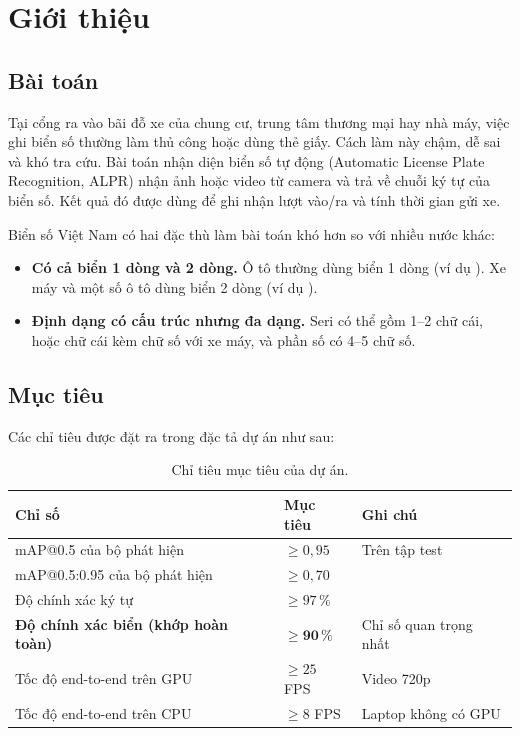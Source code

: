 \section{Giới thiệu}

\subsection{Bài toán}
Tại cổng ra vào bãi đỗ xe của chung cư, trung tâm thương mại hay nhà máy, việc ghi biển số thường làm thủ công hoặc dùng thẻ giấy. Cách làm này chậm, dễ sai và khó tra cứu. Bài toán nhận diện biển số tự động (Automatic License Plate Recognition, ALPR) nhận ảnh hoặc video từ camera và trả về chuỗi ký tự của biển số. Kết quả đó được dùng để ghi nhận lượt vào/ra và tính thời gian gửi xe.

Biển số Việt Nam có hai đặc thù làm bài toán khó hơn so với nhiều nước khác:
\begin{itemize}[nosep]
  \item \textbf{Có cả biển 1 dòng và 2 dòng.} Ô tô thường dùng biển 1 dòng (ví dụ ). Xe máy và một số ô tô dùng biển 2 dòng (ví dụ ).
  \item \textbf{Định dạng có cấu trúc nhưng đa dạng.} Seri có thể gồm 1--2 chữ cái, hoặc chữ cái kèm chữ số với xe máy, và phần số có 4--5 chữ số.
\end{itemize}

\subsection{Mục tiêu}
Các chỉ tiêu được đặt ra trong đặc tả dự án như sau:

\begin{table}[H]
\centering
\caption{Chỉ tiêu mục tiêu của dự án.}
\label{tab:targets}
\begin{tabular}{lll}
\toprule
Chỉ số & Mục tiêu & Ghi chú \\
\midrule
mAP@0.5 của bộ phát hiện & $\geq 0{,}95$ & Trên tập test \\
mAP@0.5:0.95 của bộ phát hiện & $\geq 0{,}70$ & \\
Độ chính xác ký tự & $\geq 97\,\%$ & \\
\textbf{Độ chính xác biển (khớp hoàn toàn)} & $\boldsymbol{\geq 90\,\%}$ & Chỉ số quan trọng nhất \\
Tốc độ end-to-end trên GPU & $\geq 25$ FPS & Video 720p \\
Tốc độ end-to-end trên CPU & $\geq 8$ FPS & Laptop không có GPU \\
\bottomrule
\end{tabular}
\end{table}

